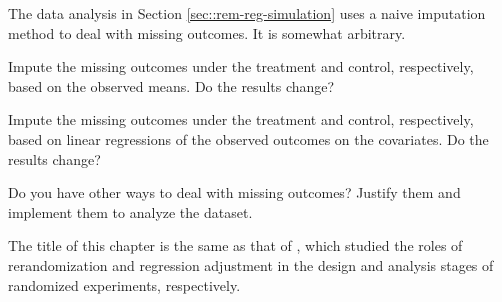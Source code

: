\begin{HomeworkProblem}\label{exr:6-14}

The data analysis in Section \ref{sec::rem-reg-simulation} uses a naive imputation method to deal with missing outcomes. It is somewhat arbitrary.

Impute the missing outcomes under the treatment and control, respectively,  based on the observed means. Do the results change?

Impute the missing outcomes under the treatment and control, respectively, based on linear regressions of the observed outcomes on the covariates. Do the results change?

Do you have other ways to deal with missing outcomes? Justify them and implement them to analyze the dataset.




\end{HomeworkProblem}

\begin{HomeworkProblem}\label{exr:6-15}

The title of this chapter is the same as that of \citet{li2019rerandomization}, which studied the roles of rerandomization and regression adjustment in the design and analysis stages of randomized experiments, respectively.



\end{HomeworkProblem}
